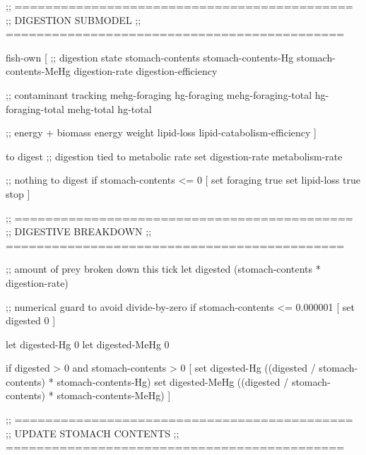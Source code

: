 \documentclass[
]{book}
\newenvironment{Shaded}{\begin{snugshade}}{\end{snugshade}}
\newcommand{\NormalTok}[1]{#1}
\begin{document}
\begin{Shaded}
\begin{Highlighting}[]
\NormalTok{;; ============================================}
\NormalTok{;; DIGESTION SUBMODEL}
\NormalTok{;; ============================================}

\NormalTok{fish{-}own [}
\NormalTok{  ;; digestion state}
\NormalTok{  stomach{-}contents}
\NormalTok{  stomach{-}contents{-}Hg}
\NormalTok{  stomach{-}contents{-}MeHg}
\NormalTok{  digestion{-}rate}
\NormalTok{  digestion{-}efficiency}

\NormalTok{  ;; contaminant tracking}
\NormalTok{  mehg{-}foraging}
\NormalTok{  hg{-}foraging}
\NormalTok{  mehg{-}foraging{-}total}
\NormalTok{  hg{-}foraging{-}total}
\NormalTok{  mehg{-}total}
\NormalTok{  hg{-}total}

\NormalTok{  ;; energy + biomass}
\NormalTok{  energy}
\NormalTok{  weight}
\NormalTok{  lipid{-}loss}
\NormalTok{  lipid{-}catabolism{-}efficiency}
\NormalTok{]}

\NormalTok{to digest}
\NormalTok{  ;; digestion tied to metabolic rate}
\NormalTok{  set digestion{-}rate metabolism{-}rate}

\NormalTok{  ;; nothing to digest}
\NormalTok{  if stomach{-}contents \textless{}= 0 [}
\NormalTok{    set foraging true}
\NormalTok{    set lipid{-}loss true}
\NormalTok{    stop}
\NormalTok{  ]}

\NormalTok{  ;; ============================================}
\NormalTok{  ;; DIGESTIVE BREAKDOWN}
\NormalTok{  ;; ============================================}

\NormalTok{  ;; amount of prey broken down this tick}
\NormalTok{  let digested (stomach{-}contents * digestion{-}rate)}

\NormalTok{  ;; numerical guard to avoid divide{-}by{-}zero}
\NormalTok{  if stomach{-}contents \textless{}= 0.000001 [ set digested 0 ]}

\NormalTok{  let digested{-}Hg   0}
\NormalTok{  let digested{-}MeHg 0}

\NormalTok{  if digested \textgreater{} 0 and stomach{-}contents \textgreater{} 0 [}
\NormalTok{    set digested{-}Hg   ((digested / stomach{-}contents) * stomach{-}contents{-}Hg)}
\NormalTok{    set digested{-}MeHg ((digested / stomach{-}contents) * stomach{-}contents{-}MeHg)}
\NormalTok{  ]}

\NormalTok{  ;; ============================================}
\NormalTok{  ;; UPDATE STOMACH CONTENTS}
\NormalTok{  ;; ============================================}


\end{Highlighting}
\end{Shaded}
\end{document}
